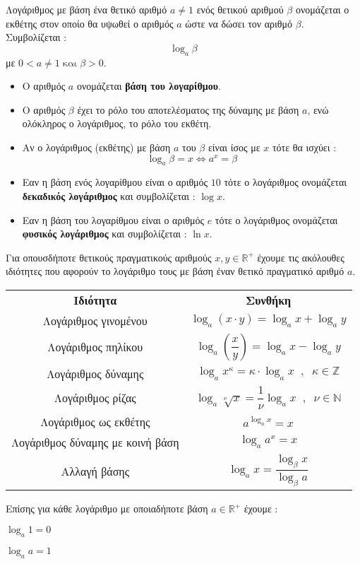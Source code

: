 \documentclass[twoside,nofonts,internet,shmeiwseis]{thewria}
\begin{document}
\orismoi
{}
Λογάριθμος με βάση ένα θετικό αριθμό $ a\neq1 $ ενός θετικού αριθμού $ \beta $ ονομάζεται ο εκθέτης στον οποίο θα υψωθεί ο αριθμός $ a $ ώστε να δώσει τον αριθμό $ \beta $. Συμβολίζεται :
\[ \log_{a}{\beta} \]
με $ 0<a\neq1\;\textrm{και}\; \beta>0 $.
\begin{itemize}[itemsep=0mm]
\item Ο αριθμός $ a $ ονομάζεται \textbf{βάση του λογαρίθμου}.
\item Ο αριθμός $ \beta $ έχει το ρόλο του αποτελέσματος της δύναμης με βάση $ a $, ενώ ολόκληρος ο λογάριθμος, το ρόλο του εκθέτη.
\item Αν ο λογάριθμος (εκθέτης) με βάση $ a $ του $ \beta $ είναι ίσος με $ x $ τότε θα ισχύει :
\[ \log_{a}{\beta}=x\Leftrightarrow a^x=\beta \]
\item Εαν η βάση ενός λογαρίθμου είναι ο αριθμός $ 10 $ τότε ο λογάριθμος ονομάζεται \textbf{δεκαδικός λογάριθμος} και συμβολίζεται : $ \log{x} $.
\item Εαν η βάση του λογαρίθμου είναι ο αριθμός $ e $ τότε ο λογάριθμος ονομάζεται \textbf{φυσικός λογάριθμος} και συμβολίζεται : $ \ln{x} $.
\end{itemize}
\thewrhmata
{}
Για οπουσδήποτε θετικούς πραγματικούς αριθμούς $ x,y\in\mathbb{R}^+ $ έχουμε τις ακόλουθες ιδιότητες που αφορούν το λογάριθμο τους με βάση έναν θετικό πραγματικό αριθμό $ a $.
\begin{center}
\begin{longtable}{cc}
\hline \rule[-2ex]{0pt}{5.5ex} \textbf{Ιδιότητα} & \textbf{Συνθήκη} \\
\hhline{==}\rule[-2ex]{0pt}{5.5ex} Λογάριθμος γινομένου & $ \log_{a}(x\cdot y)=\log_{a}x+\log_{a}y $ \\
\rule[-2ex]{0pt}{5.5ex}  Λογάριθμος πηλίκου & $ \log_{a}\left( \dfrac{x}{y}\right) =\log_{a}x-\log_{a}y $ \\
\rule[-2ex]{0pt}{5.5ex}  Λογάριθμος δύναμης & $ \log_{a}x^\kappa=\kappa\cdot\log_{a}x\;\;,\;\;\kappa\in\mathbb{Z} $ \\
\rule[-2ex]{0pt}{5.5ex}  Λογάριθμος ρίζας & $ \log_{a}\!\sqrt[\nu]{x}=\dfrac{1}{\nu}\log_{a}x\;\;,\;\;\nu\in\mathbb{N} $ \\
\rule[-2ex]{0pt}{5.5ex}  Λογάριθμος ως εκθέτης & $ a^{\log_{a}x}=x $ \\
\rule[-2ex]{0pt}{5.5ex}  Λογάριθμος δύναμης με κοινή βάση & $ \log_{a}a^x=x $ \\
\rule[-2ex]{0pt}{5.5ex}  Αλλαγή βάσης & $ \log_{a}x=\dfrac{\log_{\beta}{x}}{\log_{\beta}{a}} $ \\
\hline
\end{longtable}
\end{center}
Επίσης για κάθε λογάριθμο με οποιαδήποτε βάση $ a\in\mathbb{R}^+ $ έχουμε :
\begin{multicols}{2}
\begin{rlist}
\item $ \log_{a}1=0 $
\item $ \log_{a}a=1 $
\end{rlist}
\end{multicols}
\end{document}
